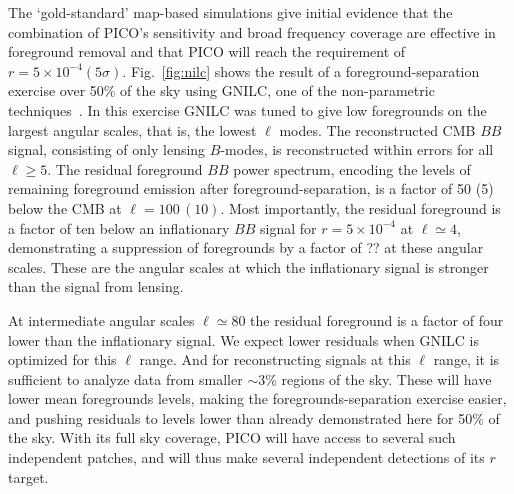\documentclass[PICOReport.tex]{subfiles}
\begin{document}
The `gold-standard' map-based simulations give initial evidence that the combination of PICO's sensitivity and broad frequency coverage are effective in foreground removal and that PICO will reach the requirement of $r = 5\times 10^{-4} (5\sigma)$. Fig.~\ref{fig:nilc} shows the result of a foreground-separation exercise over 50\% of the sky using GNILC, one of the non-parametric techniques~\citep{gnilc}.  In this exercise GNILC was tuned to give low foregrounds on the largest angular scales, that is, the lowest $\ell$ modes. The reconstructed CMB $BB$ signal, consisting of only lensing $B$-modes, is reconstructed within errors for all $\ell \geq 5$.  The residual foreground $BB$ power spectrum, encoding the levels of remaining foreground emission after foreground-separation, is a factor of 50 (5) below the CMB at $\ell=100\, (10)$. Most importantly, the residual foreground is a factor of ten below an inflationary $BB$ signal for  $r = 5\times 10^{-4}$ at $\ell \simeq 4$, demonstrating a suppression of foregrounds by a factor of ?? at these angular scales. These are the angular scales at which the inflationary signal is stronger than the signal from lensing. 

At intermediate angular scales $\ell \simeq 80$ the residual foreground is a factor of four lower than the inflationary signal. We expect lower residuals when GNILC is optimized for this $\ell$ range. And for reconstructing signals at this $\ell$ range, it is sufficient to analyze data from smaller $\sim$3\% regions of the sky. These will have lower mean foregrounds levels, making the foregrounds-separation exercise easier, and pushing residuals to levels lower than already demonstrated here for 50\% of the sky. With its full sky coverage, PICO will have access to several such independent patches, and will thus make several independent detections of its $r$ target. 

\end{document}
